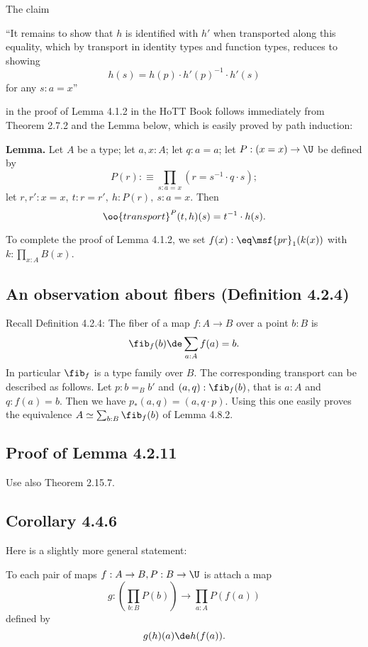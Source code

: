 \documentclass[12pt]{article}
\begin{document}
The claim

\nn ``It remains to show that $h$ is identified with $h'$ when transported along this equality, which by transport in identity types and function types, reduces to showing 
$$
h(s)=h(p)\cdot h'(p)^{-1}\cdot h'(s)
$$ 
for any $s:a=x$''

\nn in the proof of Lemma 4.1.2 in the HoTT Book follows immediately from Theorem 2.7.2 and the Lemma below, which is easily proved by path induction:

\nn \textbf{Lemma.} Let $A$ be a type; let $a,x:A$; let $q:a=a$; let $P:(x=x)\to\U$ be defined by 
$$
P(r):\equiv\prod_{s:a=x}(r=s^{-1}\cdot q\cdot s);
$$ 
let $r,r':x=x,\ t:r=r',\ h:P(r),\ s:a=x$. Then 
$$
\oo{transport}^P(t,h)(s)=t^{-1}\cdot h(s).
$$ 

To complete the proof of Lemma 4.1.2, we set $f(x):\eq\msf{pr}_1(k(x))$ with $k:\prod_{x:A}B(x)$.


\subsection{An observation about fibers (Definition 4.2.4)}

\nn Recall Definition 4.2.4: The fiber of a map $f:A\to B$ over a point $b:B$ is 
$$
\fib_f(b)\de\sum_{a:A}f(a)=b.
$$ 
In particular $\fib_f$ is a type family over $B$. The corresponding transport can be described as follows. Let $p:b=_Bb'$ and $(a,q):\fib_f(b)$, that is $a:A$ and $q:f(a)=b$. Then we have $p_*(a,q)=(a,q\cdot p)$. Using this one easily proves the equivalence $A\simeq\sum_{b:B}\fib_f(b)$ of Lemma 4.8.2.


\subsection{Proof of Lemma 4.2.11}

Use also Theorem 2.15.7.


\subsection{Corollary 4.4.6}

Here is a slightly more general statement:

To each pair of maps $f:A\to B,P:B\to\U$ is attach a map 
$$
g:\left(\prod_{b:B}P(b)\right)\to\prod_{a:A}P(f(a))
$$ 
defined by 
$$
g(h)(a)\de h(f(a)).
$$
\end{document}
